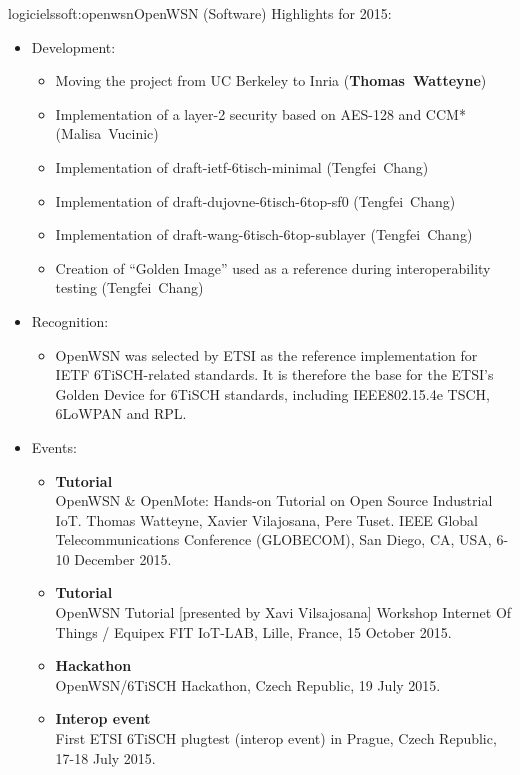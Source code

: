 \documentclass{ra2016}
\newcommand{\thomas}           {\textbf{Thomas~Watteyne}}
\begin{document}
\begin{module}{logiciels}{soft:openwsn}{OpenWSN (Software)}
Highlights for 2015:
\begin{itemize}
    \item Development:
        \begin{itemize}
            \item Moving the project from UC Berkeley to Inria (\thomas)
            \item Implementation of a layer-2 security based on AES-128 and CCM* (Malisa~Vucinic)
            \item Implementation of draft-ietf-6tisch-minimal (Tengfei~Chang)
            \item Implementation of draft-dujovne-6tisch-6top-sf0 (Tengfei~Chang)
            \item Implementation of draft-wang-6tisch-6top-sublayer (Tengfei~Chang)
            \item Creation of ``Golden Image'' used as a reference during interoperability testing (Tengfei~Chang)
        \end{itemize}
    \item Recognition:
        \begin{itemize}
            \item OpenWSN was selected by ETSI as the reference implementation for IETF 6TiSCH-related standards. It is therefore the base for the ETSI's Golden Device for 6TiSCH standards, including IEEE802.15.4e TSCH, 6LoWPAN and RPL.
        \end{itemize}
    \item Events:
        \begin{itemize}
            \item \textbf{Tutorial}\\
                OpenWSN \& OpenMote: Hands-on Tutorial on Open Source Industrial IoT. Thomas Watteyne, Xavier Vilajosana, Pere Tuset. IEEE Global Telecommunications Conference (GLOBECOM), San Diego, CA, USA, 6-10 December 2015.
            \item \textbf{Tutorial}\\
                OpenWSN Tutorial [presented by Xavi Vilsajosana] Workshop Internet Of Things / Equipex FIT IoT-LAB, Lille, France, 15 October 2015.
            \item \textbf{Hackathon}\\
                OpenWSN/6TiSCH Hackathon, Czech Republic, 19 July 2015.
            \item \textbf{Interop event}\\
                First ETSI 6TiSCH plugtest (interop event) in Prague, Czech Republic, 17-18 July 2015.
        \end{itemize}
\end{itemize}

\end{module}
\end{document}
